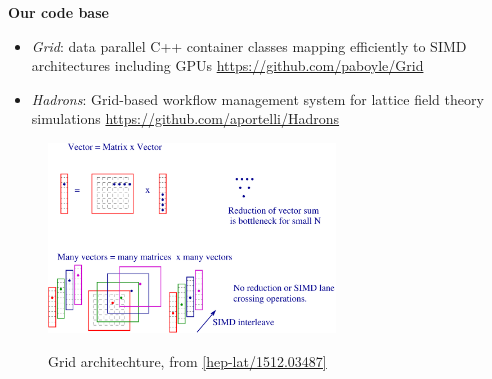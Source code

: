 \documentclass[english,11pt]{beamer}
\begin{document}
\begin{frame}
 \textbf{Our code base}
 \begin{itemize}
  \item \emph{Grid}: data parallel C++ container classes mapping efficiently to SIMD architectures including GPUs \url{https://github.com/paboyle/Grid}
  \item \emph{Hadrons}: Grid-based workflow management system for lattice field theory simulations \url{https://github.com/aportelli/Hadrons}
 \end{itemize}

 \begin{figure}[H]
	\centering
    {\includegraphics[width=3in]{diagrams/grid.pdf}}
    \caption{Grid architechture, from \url{[hep-lat/1512.03487]}}
\end{figure}
\end{frame}
\end{document}
